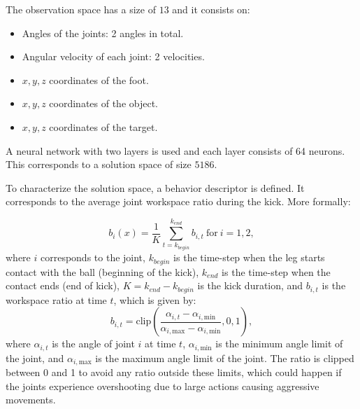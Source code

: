 \documentclass[12pt]{article}
\begin{document}
The observation space has a size of $13$ and it consists on:
\begin{itemize}
\item Angles of the joints: 2 angles in total. 
\item Angular velocity of each joint: 2 velocities.
\item $x, y, z$ coordinates of the foot.
\item $x, y, z$ coordinates of the object.
\item $x, y, z$ coordinates of the target. 
\end{itemize}

A neural network with two layers is used and each layer consists of 64 neurons. This corresponds to a solution space of size $5186$.

To characterize the solution space, a behavior descriptor is defined. It corresponds to the average joint workspace ratio during the kick. More formally:

\begin{equation}
\label{eq:bd}
b_i(x) = \frac{1}{K} \sum\limits_{t=k_{begin}}^{k_{end}} b_{i,t} \ \text{for} \ i=1, 2, 
\end{equation}
where $i$ corresponds to the joint, $k_{begin}$ is the time-step when the leg starts contact with the ball (beginning of the kick), $k_{end}$ is the time-step when the contact ends (end of kick),  $K = k_{end} - k_{begin}$ is the kick duration, and $b_{i, t}$ is the workspace ratio at time $t$, which is given by:
\begin{equation}
\label{eq:ratio}
b_{i,t} = \text{clip}\left(\frac{\alpha_{i,t} - \alpha_{i,\text{min}}}{\alpha_{i,\text{max}} - \alpha_{i,\text{min}}}, 0, 1\right),
\end{equation}
where $\alpha_{i,t}$ is the angle of joint $i$ at time $t$, $\alpha_{i,\text{min}}$ is the minimum angle limit of the joint, and $\alpha_{i,\text{max}}$ is the maximum angle limit of the joint. The ratio is clipped between 0 and 1 to avoid any ratio outside these limits, which could happen if the joints experience overshooting due to large actions causing aggressive movements.
\end{document}
